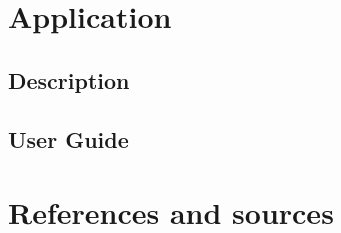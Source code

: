 \documentclass[12pt, a4paper]{article}
\begin{document}
\section{Application}

\subsection{Description}

\blindtext

\subsection{User Guide}

\blindtext

\clearpage

\section{References and sources}

\blindtext

\clearpage
\end{document}
